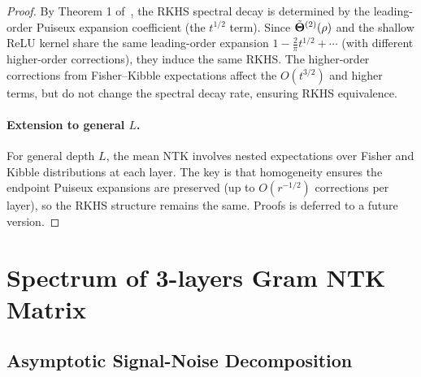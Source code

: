 \begin{proof}
By Theorem 1 of~\cite{bietti2021deepequalsshallowrelu}, the RKHS spectral decay is determined by the leading-order Puiseux expansion coefficient (the \( t^{1/2} \) term). Since \( \tilde{\boldsymbol{\Theta}}^{(2)}(\rho) \) and the shallow ReLU kernel share the same leading-order expansion \( 1 - \frac{2}{\pi} t^{1/2} + \cdots \) (with different higher-order corrections), they induce the same RKHS. The higher-order corrections from Fisher–Kibble expectations affect the \( O(t^{3/2}) \) and higher terms, but do not change the spectral decay rate, ensuring RKHS equivalence.

\paragraph{Extension to general \( L \).}
For general depth \( L \), the mean NTK involves nested expectations over Fisher and Kibble distributions at each layer. The key is that homogeneity ensures the endpoint Puiseux expansions are preserved (up to \( O(r^{-1/2}) \) corrections per layer), so the RKHS structure remains the same. Proofs is deferred to a future version.
\end{proof}






\section{Spectrum of 3-layers Gram NTK Matrix}
\label{appendix:spectral-theory}

\subsection{Asymptotic Signal-Noise Decomposition}
\label{appendix:signal-noise-decomposition}

